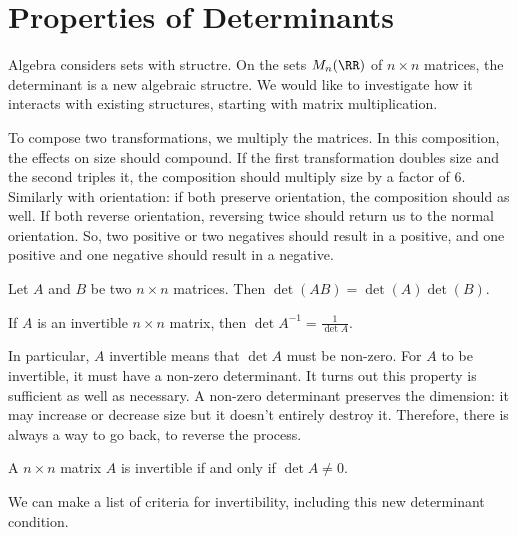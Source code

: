 \documentclass[fleqn]{report}
\begin{document}
\section{Properties of Determinants}
\label{properties-of-determinants}

Algebra considers sets with structre. On the sets $M_n(\RR)$
of $n \times n$ matrices, the determinant is a new algebraic
structre. We would like to investigate how it interacts with
existing structures, starting with matrix multiplication.

To compose two transformations, we multiply the matrices.
In this composition, the effects on size should compound. If the
first transformation doubles size and the second triples it,
the composition should multiply size by a factor of $6$.
Similarly with orientation: if both preserve orientation, the
composition should as well. If both reverse orientation,
reversing twice should return us to the normal orientation.
So, two positive or two negatives should result in a positive,
and one positive and one negative should result in a negative.

\begin{prop}
Let $A$ and $B$ be two $n \times n$ matrices. Then $\det (AB)
= \det (A) \det (B)$.
\end{prop}

\begin{prop}
If $A$ is an invertible $n \times n$ matrix, then $\det A^{-1}
= \frac{1}{\det A}$.
\end{prop}

In particular, $A$ invertible means that $\det A$ must be
non-zero. For $A$ to be invertible, it must have a non-zero
determinant. It turns out this property is sufficient as well
as necessary. A non-zero determinant preserves the dimension:
it may increase or decrease size but it doesn't entirely
destroy it. Therefore, there is always a way to go back, to
reverse the process.

\begin{prop}
A $n \times n$ matrix $A$ is invertible if and only if 
$\det A \neq 0$. 
\end{prop}

We can make a list of criteria for invertibility, including
this new determinant condition.
\end{document}
